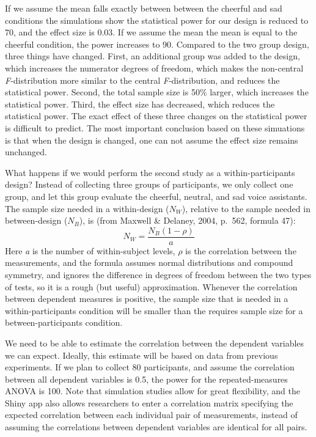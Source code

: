 \documentclass[,jou, draftfirst, a4paper,floatsintext]{apa6}
\begin{document}
If we assume the mean falls exactly between between the cheerful and sad conditions the simulations show the statistical power for our design is reduced to 70, and the effect size is 0.03.
If we assume the mean the mean is equal to the cheerful condition, the power increases to 90.
Compared to the two group design, three things have changed.
First, an additional group was added to the design, which increases the numerator degrees of freedom, which makes the non-central \emph{F}-distribution more similar to the central \emph{F}-distribution, and reduces the statistical power.
Second, the total sample size is 50\% larger, which increases the statistical power.
Third, the effect size has decreased, which reduces the statistical power.
The exact effect of these three changes on the statistical power is difficult to predict.
The most important conclusion based on these simuations is that when the design is changed, one can not assume the effect size remains unchanged.

What happens if we would perform the second study as a within-participants design?
Instead of collecting three groups of participants, we only collect one group, and let this group evaluate the cheerful, neutral, and sad voice assistants.
The sample size needed in a within-design (\(N_W\)), relative to the sample needed in between-design (\(N_B\)), is (from Maxwell \& Delaney, 2004, p.~562, formula 47):
\begin{equation}
N_{W}=\frac{N_{B}(1-\rho)}{a} \label{eq:within-n}
\end{equation}
Here \emph{a} is the number of within-subject levels, \(\rho\) is the correlation between the measurements, and the formula assumes normal distributions and compound symmetry, and ignores the difference in degrees of freedom between the two types of tests, so it is a rough (but useful) approximation.
Whenever the correlation between dependent measures is positive, the sample size that is needed in a within-participants condition will be smaller than the requires sample size for a between-participants condition.

We need to be able to estimate the correlation between the dependent variables we can expect.
Ideally, this estimate will be based on data from previous experiments.
If we plan to collect 80 participants, and assume the correlation between all dependent variables is 0.5, the power for the repeated-measures ANOVA is 100.
Note that simulation studies allow for great flexibility, and the Shiny app also allows researchers to enter a correlation matrix specifying the expected correlation between each individual pair of measurements, instead of assuming the correlations between dependent variables are identical for all pairs.
\end{document}
